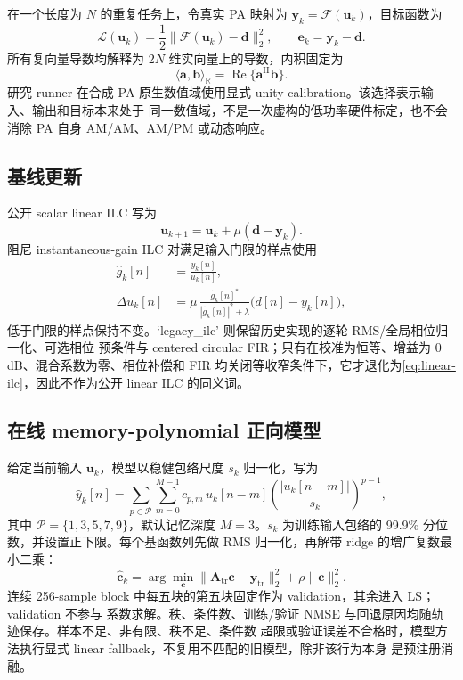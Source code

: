 \documentclass[UTF8,zihao=-4,a4paper]{ctexart}
\begin{document}
在一个长度为 $N$ 的重复任务上，令真实 PA 映射为
$\bm y_k=\mathcal{F}(\bm u_k)$，目标函数为
\begin{equation}
  \mathcal{L}(\bm u_k)=\frac{1}{2}\lVert \mathcal{F}(\bm u_k)-\bm d\rVert_2^2,
  \qquad \bm e_k=\bm y_k-\bm d .
  \label{eq:objective}
\end{equation}
所有复向量导数均解释为 $2N$ 维实向量上的导数，内积固定为
\begin{equation}
  \langle \bm a,\bm b\rangle_{\mathbb{R}}
  =\operatorname{Re}\{\bm a^{\mathrm H}\bm b\}.
  \label{eq:real-inner}
\end{equation}
研究 runner 在合成 PA 原生数值域使用显式 unity calibration。该选择表示输入、输出和目标本来处于
同一数值域，不是一次虚构的低功率硬件标定，也不会消除 PA 自身 AM/AM、AM/PM 或动态响应。

\subsection{基线更新}

公开 scalar linear ILC 写为
\begin{equation}
  \bm u_{k+1}=\bm u_k+\mu(\bm d-\bm y_k).
  \label{eq:linear-ilc}
\end{equation}
阻尼 instantaneous-gain ILC 对满足输入门限的样点使用
\begin{align}
  \widehat g_k[n]&=\frac{y_k[n]}{u_k[n]},\\
  \Delta u_k[n]&=\mu\,
  \frac{\widehat g_k[n]^*}{|\widehat g_k[n]|^2+\lambda}
  \bigl(d[n]-y_k[n]\bigr),
  \label{eq:instantaneous}
\end{align}
低于门限的样点保持不变。`legacy\_ilc' 则保留历史实现的逐轮 RMS/全局相位归一化、可选相位
预条件与 centered circular FIR；只有在校准为恒等、增益为 0 dB、混合系数为零、相位补偿和 FIR
均关闭等收窄条件下，它才退化为\cref{eq:linear-ilc}，因此不作为公开 linear ILC 的同义词。

\subsection{在线 memory-polynomial 正向模型}

给定当前输入 $\bm u_k$，模型以稳健包络尺度 $s_k$ 归一化，写为
\begin{equation}
  \widehat y_k[n]
  =\sum_{p\in\mathcal{P}}\sum_{m=0}^{M-1}
  c_{p,m}\,u_k[n-m]
  \left(\frac{|u_k[n-m]|}{s_k}\right)^{p-1},
  \label{eq:mp}
\end{equation}
其中 $\mathcal{P}=\{1,3,5,7,9\}$，默认记忆深度 $M=3$。$s_k$ 为训练输入包络的 99.9\%
分位数，并设置正下限。每个基函数列先做 RMS 归一化，再解带 ridge 的增广复数最小二乘：
\begin{equation}
  \widehat{\bm c}_k
  =\arg\min_{\bm c}
  \lVert\bm A_{\mathrm{tr}}\bm c-\bm y_{\mathrm{tr}}\rVert_2^2
  +\rho\lVert\bm c\rVert_2^2 .
  \label{eq:ridge-ls}
\end{equation}
连续 256-sample block 中每五块的第五块固定作为 validation，其余进入 LS；validation 不参与
系数求解。秩、条件数、训练/验证 NMSE 与回退原因均随轨迹保存。样本不足、非有限、秩不足、条件数
超限或验证误差不合格时，模型方法执行显式 linear fallback，不复用不匹配的旧模型，除非该行为本身
是预注册消融。
\end{document}
